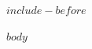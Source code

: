 \documentclass[12pt, a4paper, openany]{book}
\begin{document}
$include-before$

\setcounter{secnumdepth}{5}
\setcounter{tocdepth}{1}
\tableofcontents

$body$
\end{document}
